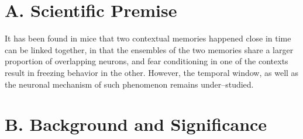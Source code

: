 \documentclass[master.tex]{subfiles}
\begin{document}
\section*{A. Scientific Premise}

It has been found in mice that two contextual memories happened close in time
can be linked together, in that the ensembles of the two memories share a larger
proportion of overlapping neurons, and fear conditioning in one of the contexts
result in freezing behavior in the other. However, the temporal window, as well
as the neuronal mechanism of such phenomenon remains under--studied.


\section*{B. Background and Significance}
\end{document}
